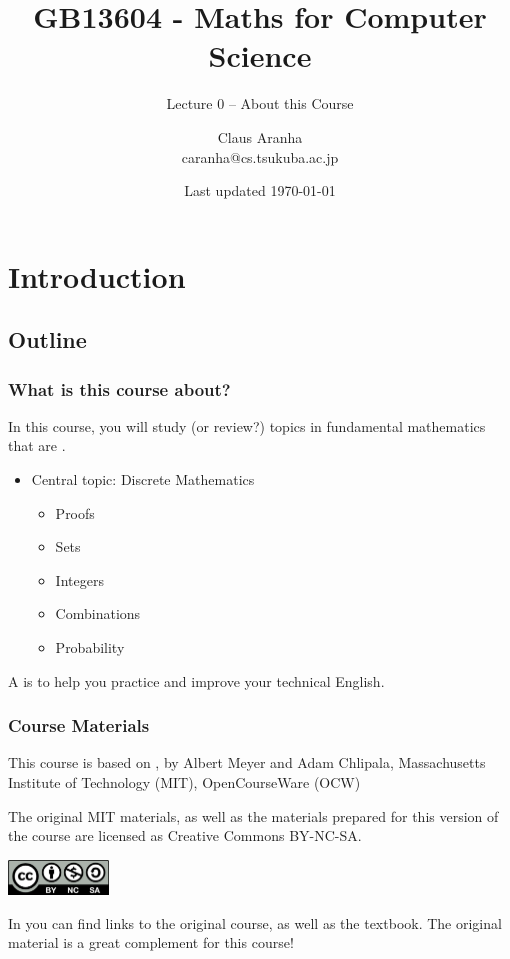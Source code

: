 \documentclass{beamer}
\title[GB13604]{GB13604 - Maths for Computer Science}
\subtitle[]{Lecture 0 -- About this Course}
\author[Claus Aranha]{Claus Aranha\\{\footnotesize caranha@cs.tsukuba.ac.jp}}
\institute[COINS]{College of Information Science}
\date[]{{\tiny Last updated \today}}
\begin{document}
\section{Introduction}
\subsection{Outline}

\begin{frame}
  \maketitle
\end{frame}

\begin{frame}
  \frametitle{What is this course about?}

  In this course, you will study (or review?) topics in fundamental mathematics that are .

  \vfill

  \begin{itemize}
  \item Central topic: Discrete Mathematics
    \begin{itemize}
    \item Proofs
    \item Sets
    \item Integers
    \item Combinations
    \item Probability
    \end{itemize}
  \end{itemize}


  \bigskip

  A  is to help you practice and improve your technical English.
\end{frame}


\begin{frame}
  \frametitle{Course Materials}


  This course is based on , by Albert Meyer and Adam Chlipala, Massachusetts Institute of Technology (MIT), OpenCourseWare (OCW)

  \bigskip

  The original MIT materials, as well as the materials prepared for this   version of the course are licensed as Creative Commons BY-NC-SA.

  \bigskip

  \begin{center}
    \includegraphics[width=0.2\textwidth]{../img/by-nc-sa}
  \end{center}

  \bigskip

  In  you can find links to the original course, as well as the textbook. \alert{The original material is a great complement for this course!}
\end{frame}
\end{document}
